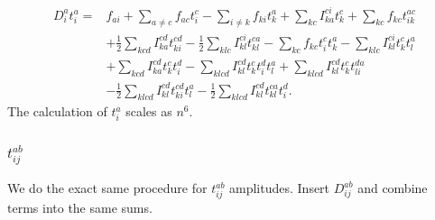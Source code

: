 \documentclass[a4paper,norsk,11pt,twoside]{report}
\begin{document}
\begin{align}
D_i^a t_i^a = & 
f_{ai} 
+ \sum_{a\not= c} f_{ac} t_i^c 
- \sum_{i \not= k} f_{ki} t_k^a 
+ \sum_{kc} I_{ka}^{ci} t_k^c 
+ \sum_{kc} f_{kc} t_{ik}^{ac} \nonumber \\ &
+ \frac{1}{2} \sum_{kcd} I_{ka}^{cd} t_{ki}^{cd} 
- \frac{1}{2} \sum_{klc} I_{kl}^{ci} t_{kl}^{ca} 
- \sum_{kc} f_{kc} t_i^c t_k^a 
- \sum_{klc} I_{kl}^{ci} t_k^c t_l^a \nonumber \\ & 
 + \sum_{kcd} I_{ka}^{cd} t_k^c t_i^d 
- \sum_{klcd} I_{kl}^{cd} t_k^c t_i^d t_l^a 
+ \sum_{klcd} I_{kl}^{cd} t_k^c t_{li}^{da} \nonumber \\ &
 - \frac{1}{2} \sum_{klcd} I_{kl}^{cd} t_{ki}^{cd} t_l^a 
- \frac{1}{2} \sum_{klcd} I_{kl}^{cd} t_{kl}^{ca} t_i^d
. 
\end{align}
The calculation of $t_i^a$ scales as $n^6$.

\subsubsection{$t_{ij}^{ab}$}
We do the exact same procedure for $t_{ij}^{ab}$ amplitudes. Insert $D_{ij}^{ab}$ and combine terms into the same sums.
\end{document}
